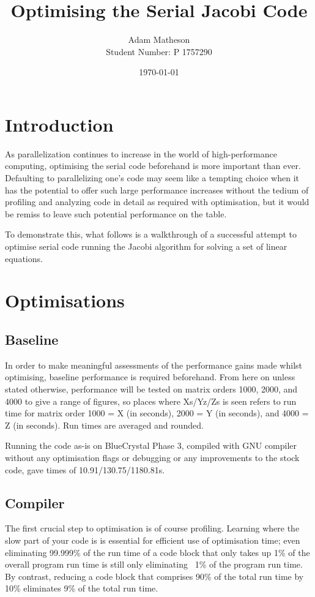 \documentclass[10pt]{article}
\begin{document}
\title{Optimising the Serial Jacobi Code}
\author{Adam Matheson \\
Student Number: P 1757290}
\date{\today}
\maketitle

\section{Introduction}
As parallelization continues to increase in the world of
high-performance computing, optimising the serial code beforehand is
more important than ever. Defaulting to parallelizing one's code may
seem like a tempting choice when it has the potential to offer such
large performance increases without the tedium of profiling and
analyzing code in detail as required with optimisation, but it would
be remiss to leave such potential performance on the table.

To demonstrate this, what follows is a walkthrough of a successful
attempt to optimise serial code running the Jacobi algorithm for
solving a set of linear equations.

\section{Optimisations}
\subsection{Baseline}
In order to make meaningful assessments of the performance gains made
whilst optimising, baseline performance is required beforehand. From
here on unless stated otherwise, performance will be tested on matrix
orders 1000, 2000, and 4000 to give a range of figures, so places
where Xs/Yz/Zs is seen refers to run time for matrix order 1000 = X
(in seconds), 2000 = Y (in seconds), and 4000 = Z (in seconds). Run
times are averaged and rounded.

Running the code as-is on BlueCrystal Phase 3, compiled with GNU
compiler without any optimisation flags or debugging or any
improvements to the stock code, gave times of 10.91/130.75/1180.81s.

\subsection{Compiler}
The first crucial step to optimisation is of course
profiling. Learning where the slow part of your code is is essential
for efficient use of optimisation time; even eliminating 99.999\% of
the run time of a code block that only takes up 1\% of the overall
program run time is still only eliminating ~1\% of the program run
time. By contrast, reducing a code block that comprises 90\% of the
total run time by 10\% eliminates 9\% of the total run time.
\end{document}
